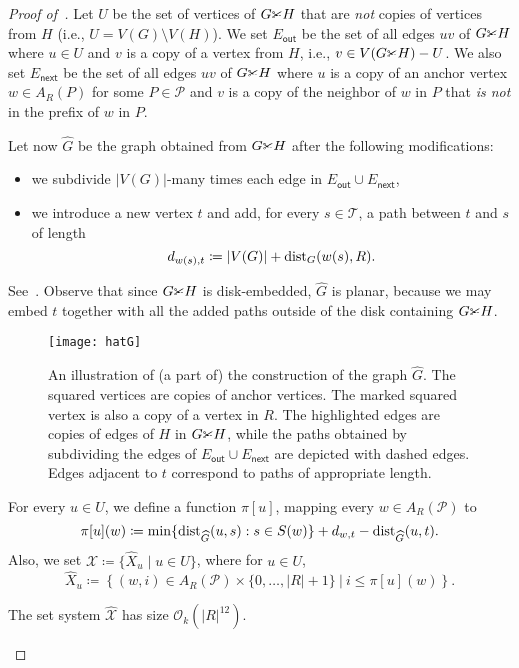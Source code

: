 \begin{proof}[Proof of~]
  Let $U$ be the set of vertices of $G\cutgraph H$ that are \textsl{not} copies of vertices from $H$ (i.e., $U=V(G)\setminus V(H)$).
  We set $E_{\mathsf{out}}$ be the set of all edges $uv$ of $G\cutgraph H$ where $u\in U$ and $v$ is a copy of a vertex from $H$,
  i.e., $v\in V(G\cutgraph H)\setminus U$.
  We also set $E_{\mathsf{next}}$ be the set of all edges $uv$ of $G\cutgraph H$ where $u$ is a copy
  of an anchor vertex $w\in A_R(P)$ for some $P\in\mathcal{P}$ and $v$ is a copy of the neighbor of $w$
  in $P$ that \textsl{is not} in the prefix of $w$ in $P$.
  
  Let now $\widehat{G}$ be the graph obtained from $G\cutgraph H$ after the following modifications:
  \begin{itemize}[nosep]
    \item we subdivide $|V(G)|$-many times each edge in $E_{\mathsf{out}}\cup E_{\mathsf{next}}$,
    \item we introduce a new vertex $t$ and add, for every $s\in\mathcal{T}$, a path between $t$
    and $s$ of length $$d_{w(s),t}\coloneqq |V(G)| + \mathrm{dist}_G(w(s),R).$$
  \end{itemize}
  See~.
  Observe that since $G\cutgraph H$ is disk-embedded, $\widehat{G}$ is planar,
  because we may embed $t$ together with all the added paths outside of the disk containing $G\cutgraph H$.

  \begin{figure}[ht]
    \centering
    \texttt{[image: hatG]}
    \caption{An illustration of (a part of) the construction of the graph $\widehat{G}$. The squared vertices are copies of anchor vertices. The marked squared vertex is also a copy of a vertex in $R$. The highlighted edges are copies of edges of $H$ in $G\cutgraph H$, while the paths obtained by subdividing the edges of $E_{\mathsf{out}}\cup E_{\mathsf{next}}$ are depicted with dashed edges. Edges adjacent to $t$ correspond to paths of appropriate length.}
    \label{fig:hatG}
  \end{figure}

  For every $u\in U$, we define a function $\pi[u]$, mapping every $w\in A_R(\mathcal{P})$ to
  \[\pi[u](w)\coloneqq\min\{\mathrm{dist}_{\widehat{G}}(u,s): s \in S(w)\}+d_{w,t}-\mathrm{dist}_{\widehat{G}}(u,t).\]
  Also, we set $\widehat{\mathcal{X}}\coloneqq\{\widehat{X}_u\mid u\in U\}$,
  where for $u\in U$,
  $$\widehat{X}_u\coloneqq\left\{(w,i) \in A_R(\mathcal{P}) \times \{0,\ldots,|R|+1\}~|~i \leq \pi[u](w)\right\}.$$

  \begin{claim}\label{cl:vcd}
    The set system $\widehat{\mathcal{X}}$ has size $\mathcal{O}_k(|R|^{12})$.
  \end{claim}


\end{proof}
